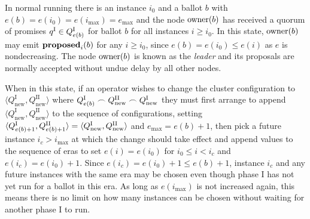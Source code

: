 \documentclass[journal]{IEEEtran}
\begin{document}
In normal running there is an instance $i_0$ and a ballot $b$ with ${e(b) =
e(i_0) = e(i_\mathrm{max}) = e_\mathrm{max}}$ and the node $\mathrm{owner}(b)$ has
received a quorum of promises $q^\textrm{I} \in {Q}^\textrm{I}_{e(b)}$ for ballot $b$ for
all instances $i \ge i_0$. In this state, $\mathrm{owner}(b)$ may emit $\mathbf{proposed}_{i}(b)$
for any $i \ge i_0$, since $e(b) = e(i_0) \le e(i)$ as $e$ is nondecreasing.
The node $\mathrm{owner}(b)$ is known as the \textit{leader} and its proposals are
normally accepted without undue delay by all other nodes.

\def\Qnew#1{Q^\textrm{#1}_\textrm{new}}

When in this state, if an operator wishes to change the cluster configuration
to $\langle \Qnew{I}, \Qnew{II} \rangle$ where $\QI{e(b)} \frown \Qnew{II}
\frown \Qnew{I}$ they must first arrange to append $\langle \Qnew{I}, \Qnew{II}
\rangle$ to the sequence of configurations, setting $\langle \QI{e(b)+1},
\QII{e(b)+1} \rangle = \langle \Qnew{I}, \Qnew{II} \rangle$ and $e_\mathrm{max}
= e(b) + 1$, then pick a future instance $i_c > i_\mathrm{max}$ at which the
change should take effect and append values to the sequence of eras to set
$e(i) = e(i_0)$ for $i_0 \le i < i_c$ and $e(i_c) = e(i_0) + 1$.  Since $e(i_c)
= e(i_0) + 1 \le e(b) + 1$, instance $i_c$ and any future instances with the
same era may be chosen even though phase I has not yet run for a ballot in this
era.  As long as $e(i_\mathrm{max})$ is not increased again, this means there
is no limit on how many instances can be chosen without waiting for another
phase I to run.
\end{document}
